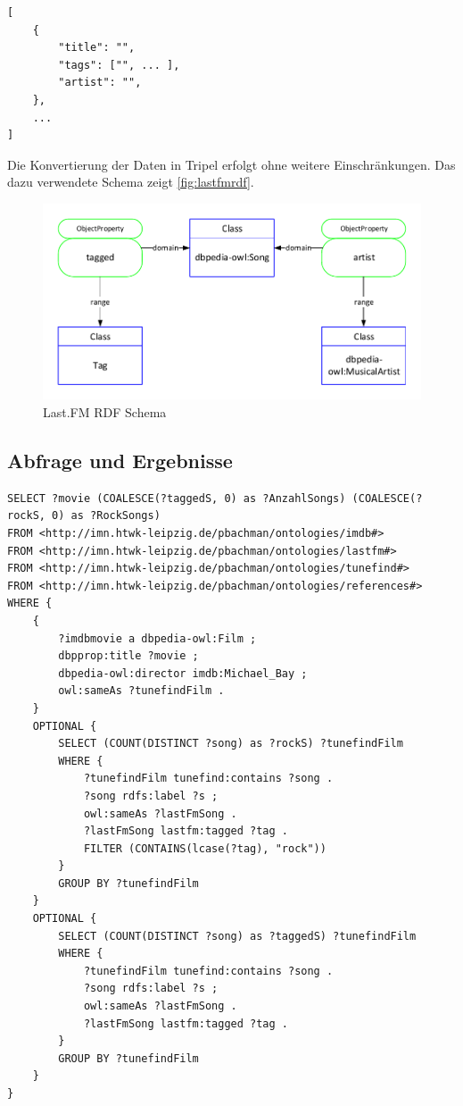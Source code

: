 \documentclass[parskip]{scrartcl}
\begin{document}
\begin{lstlisting}[caption={JSON-Format Last.FM}, label={lst:jsonLastfm}]
[
    {
        "title": "",
        "tags": ["", ... ],
        "artist": "",
    },
    ...
]
\end{lstlisting}

Die Konvertierung der Daten in Tripel erfolgt ohne weitere Einschränkungen. Das dazu verwendete Schema zeigt \autoref{fig:lastfmrdf}.

\begin{figure}[H]
    \centering
    \includegraphics[scale=0.8]{lastfm}
    \caption{Last.FM RDF Schema}
    \label{fig:lastfmrdf}
\end{figure}

\subsection{Abfrage und Ergebnisse}

\begin{lstlisting}[caption={SPARQL-Anfrage zum Beantworten der alternativen Recherchefragestellung}, label={lst:questionSparql2}]
SELECT ?movie (COALESCE(?taggedS, 0) as ?AnzahlSongs) (COALESCE(?rockS, 0) as ?RockSongs)
FROM <http://imn.htwk-leipzig.de/pbachman/ontologies/imdb#>
FROM <http://imn.htwk-leipzig.de/pbachman/ontologies/lastfm#>
FROM <http://imn.htwk-leipzig.de/pbachman/ontologies/tunefind#>
FROM <http://imn.htwk-leipzig.de/pbachman/ontologies/references#>
WHERE {
    {
        ?imdbmovie a dbpedia-owl:Film ;
        dbpprop:title ?movie ;
        dbpedia-owl:director imdb:Michael_Bay ;
        owl:sameAs ?tunefindFilm .
    }    
    OPTIONAL {
        SELECT (COUNT(DISTINCT ?song) as ?rockS) ?tunefindFilm
        WHERE {
            ?tunefindFilm tunefind:contains ?song .
            ?song rdfs:label ?s ;
            owl:sameAs ?lastFmSong .            
            ?lastFmSong lastfm:tagged ?tag .            
            FILTER (CONTAINS(lcase(?tag), "rock"))
        }
        GROUP BY ?tunefindFilm
    }    
    OPTIONAL {
        SELECT (COUNT(DISTINCT ?song) as ?taggedS) ?tunefindFilm
        WHERE {
            ?tunefindFilm tunefind:contains ?song .
            ?song rdfs:label ?s ;
            owl:sameAs ?lastFmSong .            
            ?lastFmSong lastfm:tagged ?tag .            
        }
        GROUP BY ?tunefindFilm
    }
}
\end{lstlisting}
\end{document}
